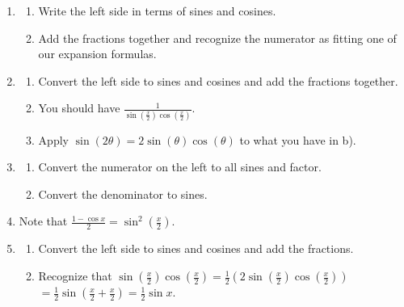 \documentclass[english]{book}
\begin{document}
\begin{enumerate}
\begin{enumerate}
\begin{enumerate}[\hspace{1cm}a)]
                \item Write $\cot(2x)$ in terms of $\cos(2x)$ and $\sin(2x)$.
                \item Expand $\cos(2x)$ and $\sin(2x)$.
                \item Write the result as the difference of two fractions.
              \end{enumerate}
        \item \begin{enumerate}[\hspace{1cm}a)]
                \item Write the left side in terms of sines and cosines.
                \item Add the fractions together and recognize the numerator as fitting one of our expansion formulas.
              \end{enumerate}
        \item \begin{enumerate}[\hspace{1cm}a)]
                \item Convert the left side to sines and cosines and add the fractions together.
                \item You should have $\frac{1}{\sin(\frac{x}{2})\cos(\frac{x}{2})}$.
                \item Apply $\sin(2\theta) = 2 \sin(\theta) \cos(\theta)$ to what you have in b).
              \end{enumerate}
        \item \begin{enumerate}[\hspace{1cm}a)]
                \item Convert the numerator on the left to all sines and factor.
                \item Convert the denominator to sines.
              \end{enumerate}
        \item Note that $\frac{1 - \cos x}{2} = \sin^{2}(\frac{x}{2})$.
        \item \begin{enumerate}[\hspace{1cm}a)]
                \item Convert the left side to sines and cosines and add the fractions.
                \item Recognize that $\sin(\frac{x}{2} ) \cos(\frac{x}{2} ) = \frac{1}{2} ( 2 \sin(\frac{x}{2}) \cos(\frac{x}{2}) )$
                   \\ $= \frac{1}{2} \sin (\frac{x}{2} + \frac{x}{2}) = \frac{1}{2} \sin x$.

\end{enumerate}
\end{enumerate}
\end{enumerate}
\end{document}
